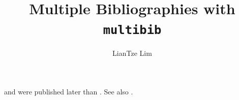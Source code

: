 \documentclass[11pt]{article}
\title{Multiple Bibliographies with \texttt{multibib}}
\author{LianTze Lim}
\date{}
\begin{document}
\maketitle

\cite{paper1} and \cite{paper2} were published later than . See also .





\end{document}
